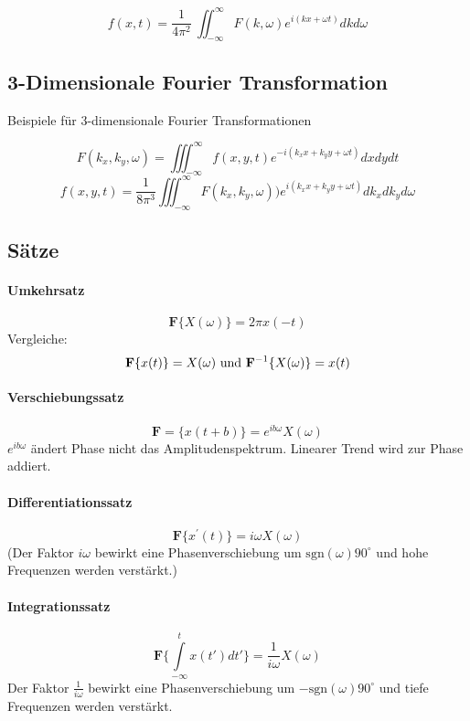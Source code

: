 \[
f(x,t)=\frac{1}{4\pi^2}\ \iint_{-\infty}^\infty F(k,\omega)e^{i(kx+\omega t)} dk d\omega
\]

\subsection{3-Dimensionale Fourier Transformation}
Beispiele für 3-dimensionale Fourier Transformationen

\[
F(k_x,k_y,\omega)=\iiint_{-\infty}^\infty f(x,y,t)e^{-i(k_xx+k_yy+\omega t)} dx dy dt
\]
\[
f(x,y,t)=\frac{1}{8\pi^3} \iiint_{-\infty}^\infty F(k_x,k_y,\omega))e^{i(k_xx+k_yy+\omega t)} dk_x dk_y d\omega
\]


\subsection{Sätze}

\paragraph{Umkehrsatz}
\begin{equation}
\textbf{F} \{X(\omega)\}=2\pi x(-t)
\end{equation}
Vergleiche:
\[
{\bf F} \{x(t)\}=X(\omega) \mbox{ und } {\bf F}^{-1}\{X(\omega)\}=x(t)
\]


\paragraph{Verschiebungssatz}
\begin{equation}
\textbf{F} = \{x(t+b)\}=e^{ib\omega}X(\omega)
\end{equation}
$e^{ib\omega}$ ändert Phase nicht das Amplitudenspektrum. Linearer Trend wird zur Phase addiert.


\paragraph{Differentiationssatz}
\begin{equation}
\textbf{F}\{x^\prime(t)\}=i\omega X(\omega)
\end{equation}
(Der Faktor $i \omega $ bewirkt eine Phasenverschiebung um $\mbox{sgn}(\omega) 90^\circ$ und hohe Frequenzen werden verstärkt.)

\paragraph{Integrationssatz}
\begin{equation}
\textbf{F} \{\int\limits_{-\infty}^{t} x(t')dt'\}=\frac{1}{i\omega} X(\omega)
\end{equation}
Der Faktor $\frac{1}{i\omega}$ bewirkt eine Phasenverschiebung um $-\mbox{sgn}(\omega) 90^\circ$ und tiefe Frequenzen werden verstärkt.

